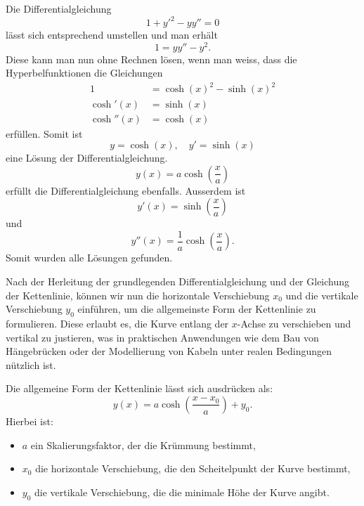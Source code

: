 Die Differentialgleichung
\begin{equation}
	1 + y'^2 - y y''
	=
	0
\end{equation}
lässt sich entsprechend umstellen und man erhält
\begin{equation}
	1
	=
	y y'' - y^2.
\end{equation}
Diese kann man nun ohne Rechnen lösen, wenn man weiss, dass die Hyperbelfunktionen die Gleichungen
\begin{align*}
	1 &= \cosh(x)^2 - \sinh(x)^2 \\
	\cosh'(x) &= \sinh(x) \\
	\cosh''(x) &= \cosh(x)
\end{align*}
erfüllen. Somit ist
\begin{equation}
	y
	=
	\cosh(x), \quad
	y'
	=
	\sinh(x)
\end{equation}
eine Lösung der Differentialgleichung.
\begin{equation}
	y(x)
	=
	a \cosh\left(\frac{x}{a}\right)
\end{equation}
erfüllt die Differentialgleichung ebenfalls. Ausserdem ist 
\begin{equation}
	y'(x)
	=
	\sinh\left(\frac{x}{a}\right)
\end{equation}
und
\begin{equation}
	y''(x)
	=
	\frac{1}{a} \cosh\left(\frac{x}{a}\right).
\end{equation}
Somit wurden alle Lösungen gefunden.

Nach der Herleitung der grundlegenden Differentialgleichung und der Gleichung der Kettenlinie, können wir nun die horizontale Verschiebung \(x_0\) und die vertikale Verschiebung \(y_0\) einführen, um die allgemeinste Form der Kettenlinie zu formulieren.
Diese erlaubt es, die Kurve entlang der \(x\)-Achse zu verschieben und vertikal zu justieren, was in praktischen Anwendungen wie dem Bau von Hängebrücken oder der Modellierung von Kabeln unter realen Bedingungen nützlich ist.

Die allgemeine Form der Kettenlinie lässt sich ausdrücken als:
\begin{equation}
	y(x)
	=
	a \cosh\left(\frac{x - x_0}{a}\right) + y_0.
\end{equation}
Hierbei ist:

\begin{itemize}
	\item \(a\) ein Skalierungsfaktor, der die Krümmung bestimmt,
	\item \(x_0\) die horizontale Verschiebung, die den Scheitelpunkt der Kurve bestimmt,
	\item \(y_0\) die vertikale Verschiebung, die die minimale Höhe der Kurve angibt.
\end{itemize}
